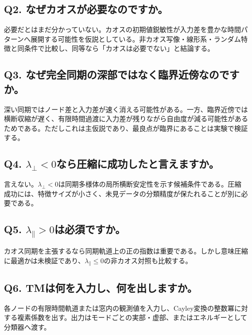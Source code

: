 \documentclass[11pt,a4paper]{ltjsarticle}
\begin{document}
\subsection*{\textcolor{researchblue}{Q2. なぜカオスが必要なのですか。}}

必要だとはまだ分かっていない。カオスの初期値鋭敏性が入力差を豊かな時間パターンへ展開する可能性を仮説としている。非カオス写像・線形系・ランダム特徴と同条件で比較し、同等なら「カオスは必要でない」と結論する。\par

\subsection*{\textcolor{researchblue}{Q3. なぜ完全同期の深部ではなく臨界近傍なのですか。}}

深い同期ではノード差と入力差が速く消える可能性がある。一方、臨界近傍では横断収縮が遅く、有限時間過渡に入力差が残りながら自由度が減る可能性があるためである。ただしこれは主仮説であり、最良点が臨界にあることは実験で検証する。\par

\subsection*{\textcolor{researchblue}{Q4. \(\lambda_{\perp}<0\)なら圧縮に成功したと言えますか。}}

言えない。\(\lambda_{\perp}<0\)は同期多様体の局所横断安定性を示す候補条件である。圧縮成功には、特徴サイズが小さく、未見データの分類精度が保たれることが別に必要である。\par

\subsection*{\textcolor{researchblue}{Q5. \(\lambda_{\parallel}>0\)は必須ですか。}}

カオス同期を主張するなら同期軌道上の正の指数は重要である。しかし意味圧縮に最適かは未検証であり、\(\lambda_{\parallel}\le 0\)の非カオス対照も比較する。\par

\subsection*{\textcolor{researchblue}{Q6. TMは何を入力し、何を出しますか。}}

各ノードの有限時間軌道または窓内の観測値を入力し、Cayley変換の整数冪に対する複素係数を出す。出力はモードごとの実部・虚部、またはエネルギーとして分類器へ渡す。\par
\end{document}
